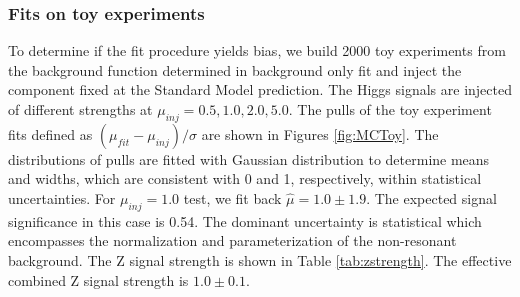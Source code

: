 




\subsubsection{Fits on toy experiments}

To determine if the fit procedure yields bias, we build 2000 toy experiments from the background function determined in background only fit and inject the \zjets{} component fixed at the Standard Model prediction. The Higgs signals are injected of different strengths at $\mu_{inj} = 0.5, 1.0, 2.0, 5.0$. The pulls of the toy experiment fits defined as $(\mu_{fit}-\mu_{inj})/ \sigma$ are shown in Figures \ref{fig:MCToy}. The distributions of pulls are fitted with Gaussian distribution to determine means and widths, which are consistent with 0 and 1, respectively, within statistical uncertainties. For $\mu_{inj}=1.0$ test, we fit back $\hat{\mu}=1.0\pm 1.9$. %
The expected signal significance in this case is 0.54. The dominant uncertainty is statistical which encompasses the normalization and parameterization of the non-resonant background. The Z signal strength is shown in Table \ref{tab:zstrength}. The effective combined Z signal strength is $1.0\pm 0.1$. %

